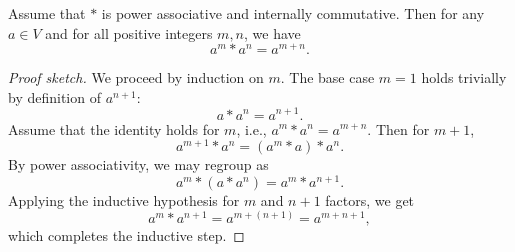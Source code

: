 \documentclass[10pt,a4paper]{amsart}
\begin{document}
\begin{proposition}
Assume that \( * \) is power associative and internally commutative. Then for any \( a \in V \) and for all positive integers \( m, n \), we have
\[
a^m * a^n = a^{m+n}.
\]
\end{proposition}

\begin{proof}[Proof sketch]
We proceed by induction on \( m \). The base case \( m = 1 \) holds trivially by definition of \( a^{n+1} \):
\[
a * a^n = a^{n+1}.
\]
Assume that the identity holds for \( m \), i.e., \( a^m * a^n = a^{m+n} \). Then for \( m+1 \),
\[
a^{m+1} * a^n = (a^m * a) * a^n.
\]
By power associativity, we may regroup as
\[
a^m * (a * a^n) = a^m * a^{n+1}.
\]
Applying the inductive hypothesis for \( m \) and \( n+1 \) factors, we get
\[
a^m * a^{n+1} = a^{m+(n+1)} = a^{m+n+1},
\]
which completes the inductive step.
\end{proof}
\end{document}
